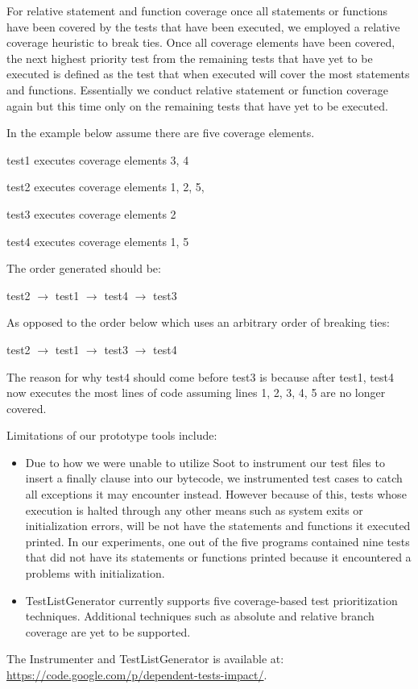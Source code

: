 For relative statement and function coverage once all statements or functions have been covered by the tests that have been executed, we employed a relative coverage heuristic to break ties. Once all coverage elements have been covered, the next highest priority test from the remaining tests that have yet to be executed is defined as the test that when executed will cover the most statements and functions. Essentially we conduct relative statement or function coverage again but this time only on the remaining tests that have yet to be executed. 

In the example below assume there are five coverage elements.

test1 executes coverage elements 3, 4

test2 executes coverage elements 1, 2, 5, 

test3 executes coverage elements 2

test4 executes coverage elements 1, 5

The order generated should be:

test2 $\rightarrow$ test1 $\rightarrow$ test4 $\rightarrow$ test3 

As opposed to the order below which uses an arbitrary order of breaking ties:

test2 $\rightarrow$ test1 $\rightarrow$ test3 $\rightarrow$ test4 

The reason for why test4 should come before test3 is because after test1, test4 now executes the most lines of code assuming lines 1, 2, 3, 4, 5 are no longer covered.

Limitations of our prototype tools include:
\begin{itemize}
\item Due to how we were unable to utilize Soot to instrument our test files to insert a finally clause into our bytecode, we instrumented test cases to catch all exceptions it may encounter instead. However because of this, tests whose execution is halted through any other means such as system exits or initialization errors, will be not have the statements and functions it executed printed. In our experiments, one out of the five programs contained nine tests that did not have its statements or functions printed because it encountered a problems with initialization. 

\item TestListGenerator currently supports five coverage-based test prioritization techniques. Additional techniques such as absolute and relative branch coverage are yet to be supported. 
\end{itemize}

The Instrumenter and TestListGenerator is available at: \url{https://code.google.com/p/dependent-tests-impact/}.

